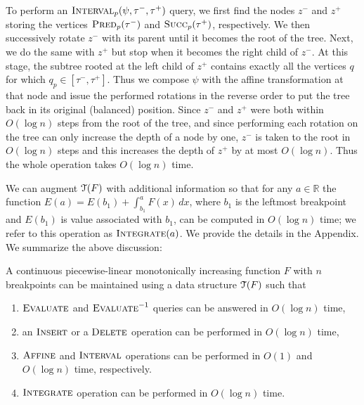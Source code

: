 \documentclass[11pt]{article}
\def\qq{q}
\def\zz{{\text{\boldmath $z$}}}
\def\pred{\mathop{\text{\sc Predecessor}}}
\def\succ{\mathop{\text{\sc Sucessor}}}
\def\TT{\EuScript{T}}
\def\zz{z}
\def\eval{\mathop{\mbox{\textsc{Evaluate}}}}
\def\evali{\mathop{\mbox{\textsc{Evaluate}}}^{-1}}
\def\ins{\mathop{\mbox{\textsc{Insert}}}}
\def\delete{\mathop{\mbox{\textsc{Delete}}}}
\def\atrans{\mathop{\textsc{Affine}}}
\def\itrans{\mathop{\textsc{Interval}}}
\def\integrate{\mathop{\textsc{Integrate}}}
\def\pred{\mathop{\textsc{Pred}}}
\def\succ{\mathop{\textsc{Succ}}}
\renewcommand{\b}[1]{\ensuremath{\mathbb{#1}}}
\begin{document}
To perform an $\itrans_p(\psi, \tau^-, \tau^+)$ query, we first find the nodes $\zz^-$ and $\zz^+$ storing the vertices $\pred_p(\tau^-)$ and $\succ_p(\tau^+)$, respectively. 
We then successively rotate $\zz^-$ with its parent until it becomes the root of the tree.  Next, we do the same with $\zz^+$ but stop when it becomes the right child of $\zz^-$.  At this stage, the subtree rooted at the left child of $\zz^+$ contains exactly all the vertices $\qq$ for which $q_p \in [\tau^-, \tau^+]$.  Thus we compose $\psi$ with the affine transformation at that node and issue the performed rotations in the reverse order to put the tree back in its original (balanced) position. Since $\zz^-$ and $\zz^+$ were both within $O(\log n)$ steps from the root of the tree, and since performing each rotation on the tree can only increase the depth of a node by one, $\zz^-$ is taken to the root in $O(\log n)$ steps and this increases the depth of $\zz^+$ by at most $O(\log n)$. Thus the whole operation takes $O(\log n)$ time.

We can augment $\TT(F)$ with additional information so that for any $a \in \b{R}$ the function $E(a) = E(b_1) + \int_{b_1}^a F(x) \, dx$, where $b_1$ is the leftmost breakpoint 
and $E(b_1)$ is value associated with $b_1$, 
can be computed in $O(\log n)$ time; we refer to this operation as $\integrate(a)$.  We provide the details in the Appendix.  
We summarize the above discussion:

\begin{theorem}\label{thm:ACT}
A continuous piecewise-linear monotonically increasing function 
$F$ with $n$ breakpoints can be maintained using a data structure 
$\TT(F)$ such that
\begin{enumerate}
\item $\eval$ and $\evali$ queries can be answered in $O(\log n)$ time,
\item an $\ins$ or a $\delete$ operation can be performed in $O(\log n)$ time, 
\item $\atrans$ and $\itrans$ operations can be performed in $O(1)$ and $O(\log n)$ time, respectively.
\item $\integrate$ operation can be performed in $O(\log n)$ time.  
\end{enumerate}
\end{theorem}
\end{document}
